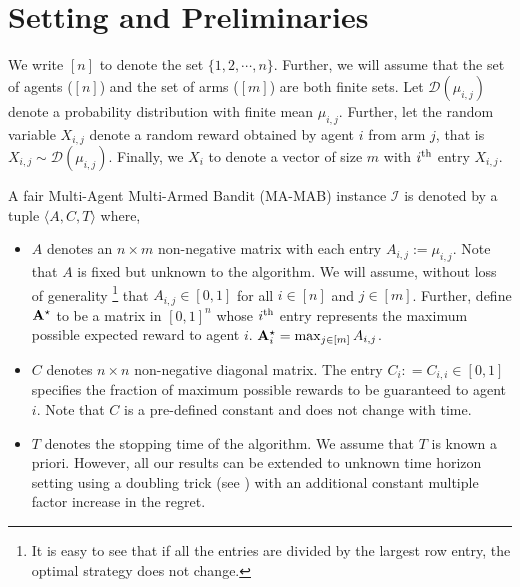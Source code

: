 \section{Setting and Preliminaries}\label{sec:settings_prelim}

We write $[n]$ to denote the set $\{1, 2, \cdots , n \}$. Further, we will assume that the set of agents ($[n]$) and the set of arms  ($[m]$) are both finite sets. 
Let $\mathcal{D}(\mu_{i,j})$ denote a  probability distribution with finite  mean $\mu_{i,j}$. Further, let the random variable  $X_{i,j}$ denote a random reward obtained by agent $i$ from arm $j$, that is  $X_{i,j} \sim \mathcal{D}(\mu_{i,j})$. Finally, we  $X_i$  to denote a vector of size $m$ with $i^{\rm{th}}$ entry  $ X_{i,j}$.

 
               A fair Multi-Agent Multi-Armed Bandit (MA-MAB)  instance $\mathcal{I}$ is denoted by a tuple $ \langle A, C, T \rangle $ where,  
\begin{itemize}
    \item $A$ denotes an $n \times m$ non-negative matrix with each entry $A_{i,j} := \mu_{i,j}$. Note that $A$ is fixed but unknown to the algorithm. We will assume, without loss of generality \footnote{ It is easy to see that if all the  entries  are divided by the largest row entry, the optimal strategy does not change.}  that $A_{i,j} \in [0,1]$ for all $i \in [n]$ and $j \in [m]$.  Further, define   $\mathbf{A}^{\star}$ to be a matrix in $[0,1]^n$ whose  $i^{\rm{th}}$ entry represents the maximum possible expected reward  to agent $i$. $\mathbf{A}^{\star}_i = \max_{j \in [m]} A_{i,j}$.  
    \item $C $ denotes $n \times n$ non-negative diagonal matrix. The entry $C_i : = C_{i,i} \in [0,1]$ specifies the fraction of maximum possible rewards to be guaranteed to agent $i$. Note that $C$ is a pre-defined constant and does not change with time. 
    \item $T$ denotes the stopping time of the algorithm. We assume that $T$ is known a priori. However,  all our results can be extended to unknown time horizon setting using a doubling trick (see \cite{besson2018doubling}) with an additional constant multiple factor increase in the regret.  
\end{itemize}

